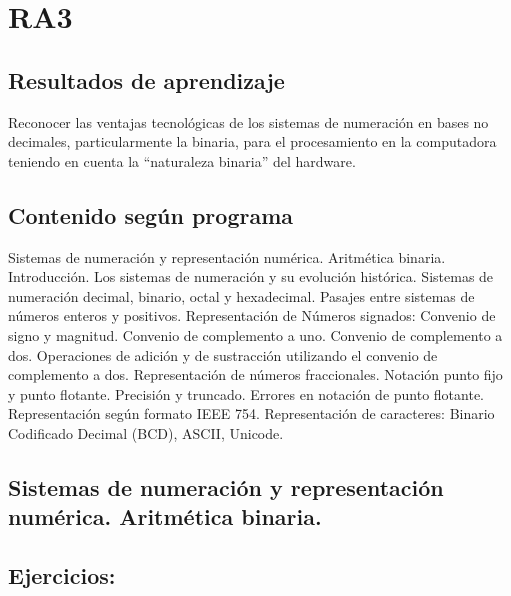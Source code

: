 \section{RA3}
\subsection*{Resultados de aprendizaje}
Reconocer las ventajas tecnológicas de los sistemas de numeración en bases no decimales, particularmente la binaria, para el procesamiento en la computadora teniendo en cuenta la ``naturaleza binaria'' del hardware.

\subsection*{Contenido según programa}
Sistemas de numeración y representación numérica.  Aritmética binaria.  Introducción. Los sistemas de numeración y su evolución histórica.  Sistemas de numeración decimal, binario, octal y hexadecimal. Pasajes entre sistemas de números enteros y positivos.  Representación de Números signados: Convenio de signo y magnitud. Convenio de complemento a uno.  Convenio de complemento a dos. Operaciones de adición y de sustracción utilizando el convenio de complemento a dos.  Representación de números fraccionales. Notación punto fijo y punto flotante.  Precisión y truncado.  Errores en notación de punto flotante.  Representación según formato IEEE 754.  Representación de caracteres: Binario Codificado Decimal (BCD), ASCII, Unicode.

\subsection*{Sistemas de numeración y representación numérica. Aritmética binaria.}
\setcounter{subsection}{2}
\subsection{Ejercicios:}

